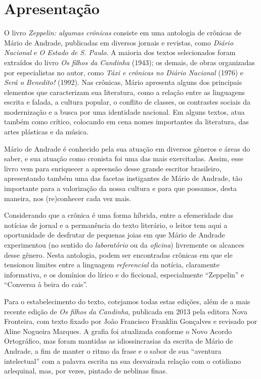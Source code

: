 \chapter[Apresentação \bigskip]{Apresentação}

O livro \emph{Zeppelin: algumas crônicas} consiste em uma antologia de crônicas de
Mário de Andrade, publicadas em diversos jornais e revistas, como
\emph{Diário Nacional} e \emph{O Estado de S. Paulo}. A maioria dos
textos selecionados foram extraídos do livro \emph{Os filhos da
Candinha} (1943); os demais, de obras organizadas por especialistas no
autor, como \emph{Táxi e crônicas no Diário Nacional} (1976) e
\emph{Será o Benedito!} (1992). Nas crônicas, Mário apresenta alguns dos
principais elementos que caracterizam sua literatura, como a relação
entre as linguagens escrita e falada, a cultura popular, o conflito de
classes, os contrastes sociais da modernização e a busca por uma
identidade nacional. Em alguns textos, atua também como crítico,
colocando em cena nomes importantes da literatura, das artes plásticas e
da música.

Mário de Andrade é conhecido pela sua atuação em diversos gêneros e
áreas do saber, e sua atuação como cronista foi uma das mais
exercitadas. Assim, esse livro vem para enriquecer a apreensão
desse grande escritor brasileiro,
apresentando também uma das facetas instigantes de Mário de Andrade,
tão importante para a valorização da nossa cultura e para
que possamos, desta maneira, nos (re)conhecer cada vez mais.

Considerando que a crônica é uma forma híbrida, entre a efemeridade das
notícias de jornal e a permanência do texto literário, o leitor tem aqui
a oportunidade de desfrutar de pequenas joias em que Mário de Andrade
experimentou (no sentido do \emph{laboratório} ou da \emph{oficina})
livremente os alcances desse gênero. Nesta antologia, podem ser
encontradas crônicas em que ele tensionou limites entre a linguagem
\emph{referencial} da notícia, claramente informativa, e os domínios do
lírico e do ficcional, especialmente ``Zeppelin'' e ``Conversa à beira
do cais''.

Para o estabelecimento do texto, cotejamos todas estas edições, além de
a mais recente edição de \emph{Os filhos da Candinha}, publicada em 2013
pela editora Nova Fronteira, com texto fixado por João Francisco
Franklin Gonçalves e revisado por Aline Nogueira Marques. A grafia foi
atualizada conforme o Novo Acordo Ortográfico, mas foram mantidas as
idiossincrasias da escrita de Mário de Andrade, a fim de manter o ritmo
da frase e o sabor de sua ``aventura intelectual'' com a palavra escrita
na sua desvairada relação com o cotidiano arlequinal, mas, por vezes,
pintado de neblinas finas.

